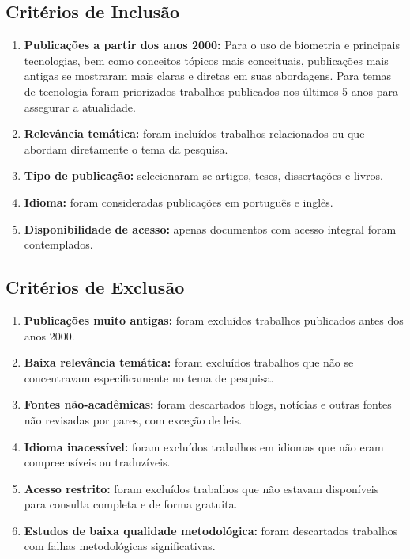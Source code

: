 \subsection{Critérios de Inclusão}\label{subsec:criterios-de-inclusao}

\begin{enumerate}
    \item \textbf{Publicações a partir dos anos 2000:} Para o uso de biometria e principais tecnologias, bem como conceitos tópicos mais conceituais, publicações mais antigas se mostraram mais claras e diretas em suas abordagens.
    Para temas de tecnologia foram priorizados trabalhos publicados nos últimos 5 anos para assegurar a atualidade.
    \item \textbf{Relevância temática:} foram incluídos trabalhos relacionados ou que abordam diretamente o tema da pesquisa.
    \item \textbf{Tipo de publicação:} selecionaram-se artigos, teses, dissertações e livros.
    \item \textbf{Idioma:} foram consideradas publicações em português e inglês.
    \item \textbf{Disponibilidade de acesso:} apenas documentos com acesso integral foram contemplados.
\end{enumerate}

\subsection{Critérios de Exclusão}\label{subsec:criterios-de-exclusao}

\begin{enumerate}
    \item \textbf{Publicações muito antigas:} foram excluídos trabalhos publicados antes dos anos 2000.
    \item \textbf{Baixa relevância temática:} foram excluídos trabalhos que não se concentravam especificamente no tema de pesquisa.
    \item \textbf{Fontes não-acadêmicas:} foram descartados blogs, notícias e outras fontes não revisadas por pares, com exceção de leis.
    \item \textbf{Idioma inacessível:} foram excluídos trabalhos em idiomas que não eram compreensíveis ou traduzíveis.
    \item \textbf{Acesso restrito:} foram excluídos trabalhos que não estavam disponíveis para consulta completa e de forma gratuita.
    \item \textbf{Estudos de baixa qualidade metodológica:} foram descartados trabalhos com falhas metodológicas significativas.
\end{enumerate}


